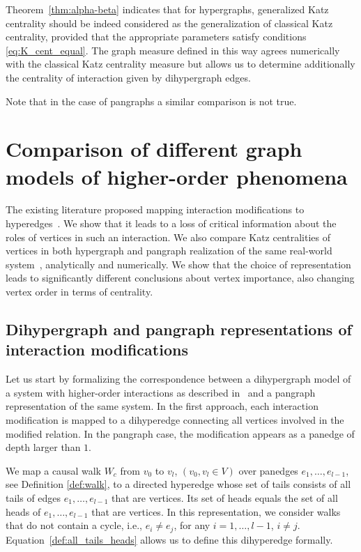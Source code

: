 \documentclass[a4paper,12pt]{article}
\theoremstyle{definition}
\theoremstyle{remark}
\begin{document}
Theorem~\ref{thm:alpha-beta} indicates that for hypergraphs, generalized Katz centrality should be indeed considered as the generalization of classical Katz centrality, provided that the appropriate parameters satisfy conditions \eqref{eq:K_cent_equal}. The graph measure defined in this way agrees numerically with the classical Katz centrality measure but allows us to determine additionally the centrality of interaction given by dihypergraph edges. 

Note that in the case of pangraphs a similar comparison is not true.

\section{Comparison of different graph models of higher-order phenomena}\label{sec:real_exam}

The existing literature proposed mapping interaction modifications to hyperedges~\cite{GOLUBSKI2016344, BATTISTON20201}. We show that it leads to a loss of critical information about the roles of vertices in such an interaction. We also compare Katz centralities of vertices in both hypergraph and pangraph realization of the same real-world system~\cite{GOLUBSKI2016344}, analytically and numerically. We show that the choice of representation leads to significantly different conclusions about vertex importance, also changing vertex order in terms of centrality.


\subsection{Dihypergraph and pangraph representations of interaction modifications}\label{subsec:hyp_vs_pan}

Let us start by formalizing the correspondence between a dihypergraph model of a system with higher-order interactions as described in~\cite{GOLUBSKI2016344} and a pangraph representation of the same system. In the first approach, each interaction modification is mapped to a dihyperedge connecting all vertices involved in the modified relation. In the pangraph case, the modification appears as a panedge of depth larger than $1$. 

We map a causal walk $W_c$ from $v_0$ to $v_l$, $(v_0,v_l\in V)$ over panedges $e_1, \ldots, e_{l-1}$, see Definition \ref{def:walk}, to a directed hyperedge whose set of tails consists of all tails of edges $e_1, \ldots, e_{l-1}$ that are vertices. Its set of heads equals the set of all heads of $e_1, \ldots, e_{l-1}$ that are vertices. In this representation, we consider walks that do not contain a cycle, i.e., $e_i\neq e_j$, for any $i=1,\ldots,l-1$, $i\neq j$. Equation~\eqref{def:all_tails_heads} allows us to define this dihyperedge formally.
\end{document}
